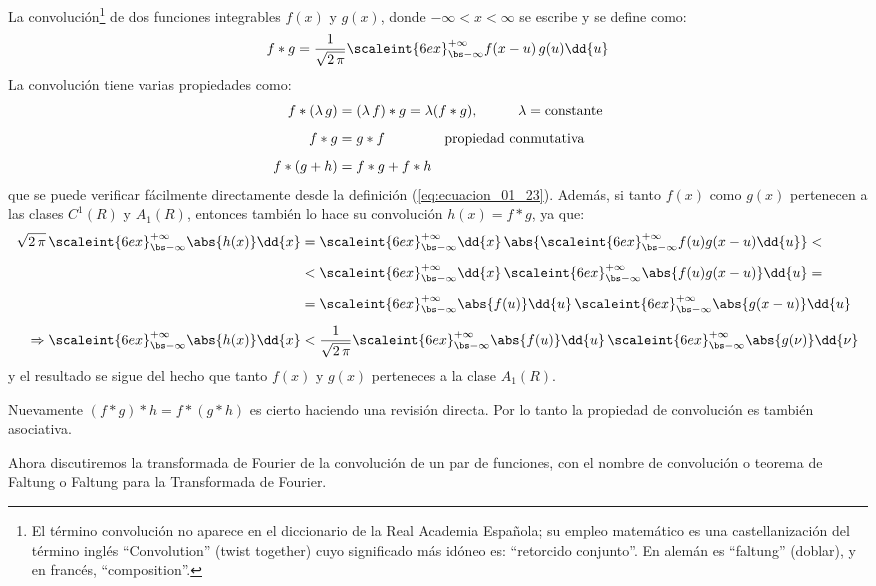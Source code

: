 La convolución\footnote{El término convolución no aparece en el diccionario de la Real Academia Española; su empleo matemático es una castellanización del término inglés \enquote{Convolution} (twist together) cuyo significado más idóneo es: \enquote{retorcido conjunto}. En alemán es \enquote{faltung} (doblar), y en francés, \enquote{composition}.} de dos funciones integrables $f(x)$ y $g(x)$, donde \hfill \break
$-\infty < x < \infty$ se escribe y se define como:
\begin{align}
f * g = \dfrac{1}{\sqrt{2 \, \pi}} \scaleint{6ex}_{\bs -\infty}^{+\infty} f(x - u) \, g(u) \dd{u}
\label{eq:ecuacion_01_23}
\end{align}
La convolución tiene varias propiedades como:
\begin{align*}
f * (\lambda \, g) &= (\lambda \, f) * g = \lambda (f * g), \hspace{1cm} \lambda = \mbox{constante} \\[0.5em]
f * g &= g * f \hspace{1.5cm} \mbox{propiedad conmutativa} \\[0.5em]
f * (g + h) &= f * g + f * h
\end{align*}
que se puede verificar fácilmente directamente desde la definición (\ref{eq:ecuacion_01_23}). \hfill \break 
Además, si tanto $f (x)$ como $g (x)$ pertenecen a las clases $C^{1} (R)$ y $A_{1} (R)$, entonces también lo hace su convolución $h (x) = f * g$, ya que:
\begin{align*}
\sqrt{2 \, \pi} \, \scaleint{6ex}_{\bs -\infty}^{+\infty} \abs{h(x)} \dd{x} &= \scaleint{6ex}_{\bs -\infty}^{+\infty} \dd{x} \, \abs{\scaleint{6ex}_{\bs -\infty}^{+\infty} f(u) g(x - u) \dd{u}} < \\[0.5em]
&< \scaleint{6ex}_{\bs -\infty}^{+\infty} \dd{x} \, \scaleint{6ex}_{\bs -\infty}^{+\infty} \abs{f(u) g(x - u)} \dd{u} = \\[0.5em]
&= \scaleint{6ex}_{\bs -\infty}^{+\infty} \abs{f(u)} \dd{u} \, \scaleint{6ex}_{\bs -\infty}^{+\infty} \abs{g(x - u)} \dd{u} \\[0.5em]
\Rightarrow \scaleint{6ex}_{\bs -\infty}^{+\infty} \abs{h(x)} \dd{x} &< \dfrac{1}{\sqrt{2 \, \pi}} \scaleint{6ex}_{\bs -\infty}^{+\infty} \abs{f(u)} \dd{u} \, \scaleint{6ex}_{\bs -\infty}^{+\infty} \abs{g(\nu)} \dd{\nu}
\end{align*}
y el resultado se sigue del hecho que tanto $f(x)$ y $g(x)$ perteneces a la clase $A_{1}(R)$.
\par
Nuevamente $(f * g) * h = f * (g * h)$ es cierto haciendo una revisión directa. Por lo tanto la propiedad de convolución es también asociativa.
\par
Ahora discutiremos la transformada de Fourier de la convolución de un par de funciones, con el nombre de convolución o teorema de Faltung o Faltung para la Transformada de Fourier.


